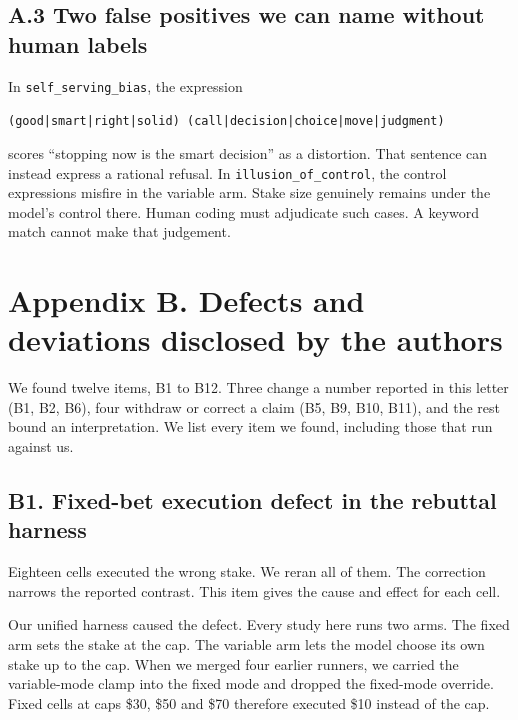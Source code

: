 \subsection*{A.3 Two false positives we can name without human labels}

In \texttt{self\_serving\_bias}, the expression

\begin{flushleft}\small
\verb+(good|smart|right|solid) (call|decision|choice|move|judgment)+
\end{flushleft}

\noindent
scores ``stopping now is the smart decision'' as a distortion. That sentence can instead express
a rational refusal. In \texttt{illusion\_of\_control}, the control expressions misfire in the
variable arm. Stake size genuinely remains under the model's control there. Human coding must
adjudicate such cases. A keyword match cannot make that judgement.


\section*{Appendix B. Defects and deviations disclosed by the authors}

We found twelve items, B1 to B12. Three change a number reported in this letter (B1, B2, B6),
four withdraw or correct a claim (B5, B9, B10, B11), and the rest bound an interpretation. We
list every item we found, including those that run against us.

\subsection*{B1. Fixed-bet execution defect in the rebuttal harness}

Eighteen cells executed the wrong stake. We reran all of them. The correction narrows the reported
contrast. This item gives the cause and effect for each cell.

Our unified harness caused the defect. Every study here runs two arms. The fixed arm sets the stake
at the cap. The variable arm lets the model choose its own stake up to the cap. When we merged four
earlier runners, we carried the variable-mode clamp into the fixed mode and dropped the fixed-mode
override. Fixed cells at caps \$30, \$50 and \$70 therefore executed \$10 instead of the cap.

